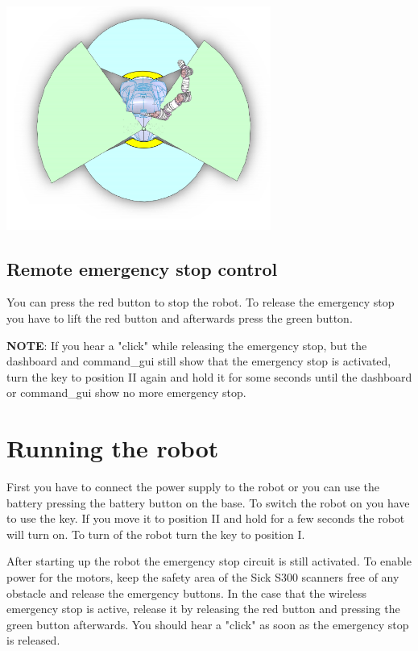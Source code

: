 \begin{center}
\includegraphics[width=0.65\textwidth]{images/protection_areas.png}
\end{center}

\subsection{Remote emergency stop control}
You can press the red button to stop the robot. To release the emergency stop you have to lift the red button and afterwards press the green button.


\textbf{NOTE}: If you hear a "click" while releasing the emergency stop, but the dashboard and command\_gui still show that the emergency stop is activated, turn the key to position II again and hold it for some seconds until the dashboard or command\_gui show no more emergency stop.


\section{Running the robot}
First you have to connect the power supply to the robot or you can use the battery pressing the battery button on the base. To switch the robot on you have to use the key. If you move it to position II and hold for a few seconds the robot will turn on. To turn of the robot turn the key to position I. 

After starting up the robot the emergency stop circuit is still activated. To enable power for the motors, keep the safety area of the Sick S300 scanners free of any obstacle and release the emergency buttons. In the case that the wireless emergency stop is active, release it by releasing the red button and pressing the green button afterwards. You should hear a "click" as soon as the emergency stop is released.

